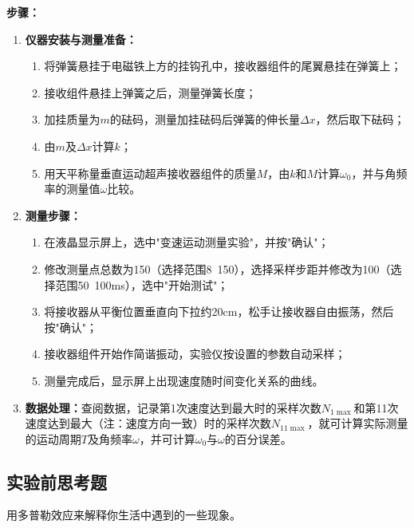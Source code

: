 \documentclass[dvipsnames, svgnames,a4paper,11pt]{article}
\newcommand{\recordblank}[1]{\par\vspace*{#1}\par}
\begin{document}
\textbf{步骤：}
\begin{enumerate}
	\item \textbf{仪器安装与测量准备：}
	\begin{enumerate}
		\item 将弹簧悬挂于电磁铁上方的挂钩孔中，接收器组件的尾翼悬挂在弹簧上；
		\item 接收组件悬挂上弹簧之后，测量弹簧长度；
		\item 加挂质量为$m$的砝码，测量加挂砝码后弹簧的伸长量$\Delta x$，然后取下砝码；
		\item 由$m$及$\Delta x$计算$k$；
		\item 用天平称量垂直运动超声接收器组件的质量$M$，由$k$和$M$计算$\omega_0$，并与角频率的测量值$\omega$比较。
	\end{enumerate}
	
	\item \textbf{测量步骤：}
	\begin{enumerate}
		\item 在液晶显示屏上，选中"变速运动测量实验"，并按"确认"；
		\item 修改测量点总数为150（选择范围8~150），选择采样步距并修改为100（选择范围50~100ms），选中"开始测试"；
		\item 将接收器从平衡位置垂直向下拉约20cm，松手让接收器自由振荡，然后按"确认"；
		\item 接收器组件开始作简谐振动，实验仪按设置的参数自动采样；
		\item 测量完成后，显示屏上出现速度随时间变化关系的曲线。
	\end{enumerate}
	
	\item \textbf{数据处理：}查阅数据，记录第1次速度达到最大时的采样次数$N_{1\max}$和第11次速度达到最大（注：速度方向一致）时的采样次数$N_{11\max}$，就可计算实际测量的运动周期$T$及角频率$\omega$，并可计算$\omega_0$与$\omega$的百分误差。
\end{enumerate}

\subsection{实验前思考题}

\begin{question}
用多普勒效应来解释你生活中遇到的一些现象。
\end{question}
\recordblank{4cm}
\end{document}
